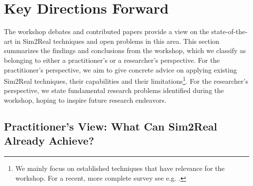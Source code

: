 \section{Key Directions Forward}


The workshop debates and contributed papers provide a view on the state-of-the-art in Sim2Real techniques and open problems in this area. This section summarizes the findings and conclusions from the workshop, which we classify as belonging to either a practitioner's or a researcher's perspective. For the practitioner's perspective, we aim to give concrete advice on applying existing Sim2Real techniques, their capabilities and their limitations\footnote{We mainly focus on established techniques that have relevance for the workshop. For a recent, more complete survey see e.g. \cite{zhao2020simtoreal}.}. For the researcher's perspective, we state fundamental research problems identified during the workshop, hoping to inspire future research endeavors. 


\subsection{Practitioner’s View: What Can Sim2Real Already Achieve?}

